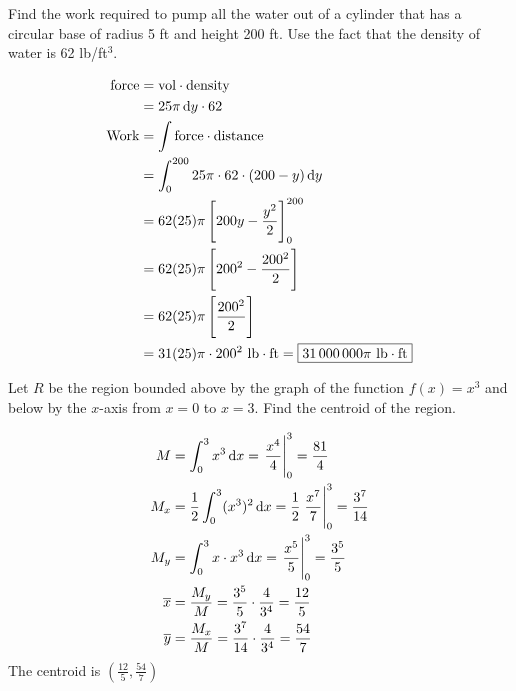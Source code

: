 \documentclass[12pt,answers]{exam}
\newcommand{\inv}{^{-1}}
\begin{document}
\begin{questions}
\newpage
\question[12]
Find the work required to pump all the water out of a cylinder that has a circular base of radius 5 ft and height 200 ft. Use the fact that the density of water is 62 lb/ft$^3$.
\begin{solution}
    \begin{align*}
        \text{force} &= \text{vol} \cdot \text{density} \\ 
        &= 25\pi \dif y \cdot 62 \\ 
        \text{Work} &= \int \text{force} \cdot \text{distance} \\ 
        &= \int_0^{200} 25 \pi \cdot 62 \cdot (200-y) \dif y \\ 
        &= 62 (25) \pi \left[ 200y - \frac{y^2}{2}\right]_0^{200} \\ 
        &= 62 (25) \pi \left[ 200^2 - \frac{200^2}{2}\right] \\ 
        &= 62 (25) \pi \left[ \frac{200^2}{2}\right] \\ 
        &= 31(25) \pi \cdot 200^2\ \text{lb}\cdot\text{ft}
        = \boxed{31\,000\,000\pi\ \text{lb}\cdot\text{ft}}
    \end{align*}
\end{solution}

\newpage
\question[12]
Let $R$ be the region bounded above by the graph of the function $f(x) = x^3$ and below by the $x$-axis from $x=0$ to $x=3$. 
Find the centroid of the region.
\begin{solution}
    \begin{align*}
        M &= \int_0^3 x^3 \dif x 
        = \eval{\frac{x^4}{4}}_0^3 
        = \frac{81}{4} \\ 
        M_x &= \frac12 \int_0^3 (x^3)^2 \dif x 
        = \frac12 \eval{\frac{x^7}{7}}_0^3
        = \frac{3^7}{14} \\ 
        M_y &= \int_0^3 x \cdot x^3 \dif x 
        = \eval{\frac{x^5}{5}}_0^3 
        = \frac{3^5}{5} \\
        \overline x &= \frac{M_y}{M} 
        = \frac{3^5}{5} \cdot \frac{4}{3^4} = \frac{12}{5} \\
        \overline y &= \frac{M_x}{M} 
        = \frac{3^7}{14} \cdot \frac{4}{3^4} = \frac{54}{7}
    \end{align*}
    The centroid is $\boxed{\left(\frac{12}{5}, \frac{54}{7}\right)}$
\end{solution}

\newpage
\question
{}
\end{questions}
\end{document}
